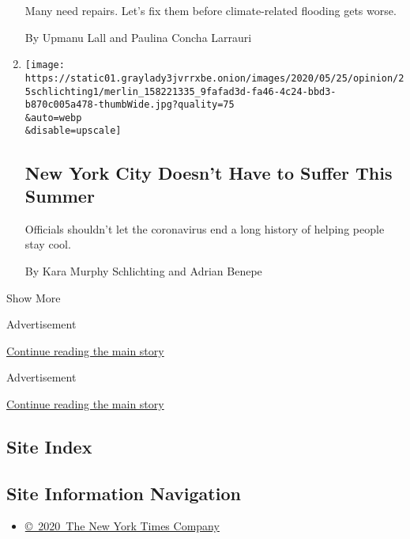 \begin{enumerate}
  Many need repairs. Let's fix them before climate-related flooding gets
  worse.

  By Upmanu Lall and Paulina Concha Larrauri
\item
  \href{/2020/05/25/opinion/new-york-summer-coronavirus.html}{}

  \texttt{[image: https://static01.graylady3jvrrxbe.onion/images/2020/05/25/opinion/25schlichting1/merlin\_158221335\_9fafad3d-fa46-4c24-bbd3-b870c005a478-thumbWide.jpg?quality=75\\\&auto=webp\\\&disable=upscale]}

  \hypertarget{new-york-city-doesnt-have-to-suffer-this-summer}{%
  \subsection{New York City Doesn't Have to Suffer This
  Summer}\label{new-york-city-doesnt-have-to-suffer-this-summer}}

  Officials shouldn't let the coronavirus end a long history of helping
  people stay cool.

  By Kara Murphy Schlichting and Adrian Benepe
\end{enumerate}

Show More

Advertisement

\protect\hyperlink{after-mid1}{Continue reading the main story}

Advertisement

\protect\hyperlink{after-mktg}{Continue reading the main story}

\hypertarget{site-index}{%
\subsection{Site Index}\label{site-index}}

\hypertarget{site-information-navigation}{%
\subsection{Site Information
Navigation}\label{site-information-navigation}}

\begin{itemize}
\tightlist
\item
  \href{https://help.nytimes3xbfgragh.onion/hc/en-us/articles/115014792127-Copyright-notice}{©~2020~The
  New York Times Company}
\end{itemize}

